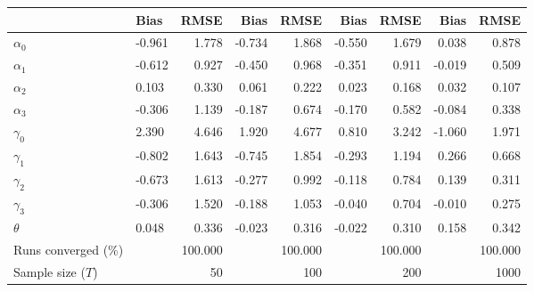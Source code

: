 
\begin{tabular}[t]{llrrrrrrr}
\toprule
  & Bias & RMSE & Bias & RMSE & Bias & RMSE & Bias & RMSE\\
\midrule
$\alpha_{0}$ & -0.961 & 1.778 & -0.734 & 1.868 & -0.550 & 1.679 & 0.038 & 0.878\\
$\alpha_{1}$ & -0.612 & 0.927 & -0.450 & 0.968 & -0.351 & 0.911 & -0.019 & 0.509\\
$\alpha_{2}$ & 0.103 & 0.330 & 0.061 & 0.222 & 0.023 & 0.168 & 0.032 & 0.107\\
$\alpha_{3}$ & -0.306 & 1.139 & -0.187 & 0.674 & -0.170 & 0.582 & -0.084 & 0.338\\
$\gamma_{0}$ & 2.390 & 4.646 & 1.920 & 4.677 & 0.810 & 3.242 & -1.060 & 1.971\\
$\gamma_{1}$ & -0.802 & 1.643 & -0.745 & 1.854 & -0.293 & 1.194 & 0.266 & 0.668\\
$\gamma_{2}$ & -0.673 & 1.613 & -0.277 & 0.992 & -0.118 & 0.784 & 0.139 & 0.311\\
$\gamma_{3}$ & -0.306 & 1.520 & -0.188 & 1.053 & -0.040 & 0.704 & -0.010 & 0.275\\
$\theta$ & 0.048 & 0.336 & -0.023 & 0.316 & -0.022 & 0.310 & 0.158 & 0.342\\
Runs converged (\%) &  & 100.000 &  & 100.000 &  & 100.000 &  & 100.000\\
Sample size ($T$) &  & 50 &  & 100 &  & 200 &  & 1000\\
\bottomrule
\end{tabular}
